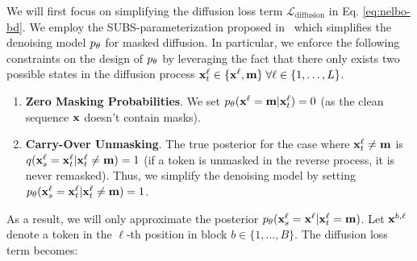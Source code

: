 \documentclass{article} %
\begin{document}
We will first focus on simplifying the diffusion loss term $\mathcal{L}_\text{diffusion}$ in Eq. \ref{eq:nelbo-bd}. We employ the SUBS-parameterization proposed in~\citet{sahoo2024diffusion} which simplifies the denoising model ${p_\theta}$ for masked diffusion. In particular, we enforce the following constraints on the design of ${p_\theta}$ by leveraging the fact that there only exists two possible states in the diffusion process ${\mathbf x}^\ell_t \in \{ {\mathbf x}^\ell, {\mathbf m} \} \; \forall \ell \in \{1, \dots, L\}$. 
\begin{enumerate}
    \item \textbf{Zero Masking Probabilities}. We set $p_\theta({\mathbf x}^\ell = {\mathbf m} | {\mathbf x}^\ell_t) = 0$ (as the clean sequence ${\mathbf x}$ doesn't contain masks).
    \item \textbf{Carry-Over Unmasking}. The true posterior for the case where ${\mathbf x}^\ell_t \neq {\mathbf m}$ is $q({\mathbf x}^\ell_s = {\mathbf x}^\ell_t | {\mathbf x}^\ell_t \neq {\mathbf m}) = 1$ (if a token is unmasked in the reverse process, it is never remasked). Thus, we simplify the denoising model by setting $p_\theta ({\mathbf x}^\ell_s = {\mathbf x}^\ell_t | {\mathbf x}^\ell_t \neq {\mathbf m}) = 1$.
\end{enumerate}
As a result, we will only approximate the posterior ${p_\theta}({\mathbf x}^\ell_s = {\mathbf x}^\ell | {\mathbf x}^\ell_t = {\mathbf m})$. Let ${\mathbf x}^{b, \ell}$ denote a token in the $\ell$-th position in block $b \in \{1, \dots, B\}$. The diffusion loss term becomes:
\end{document}
